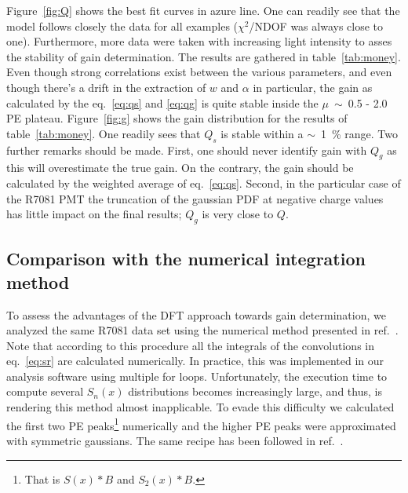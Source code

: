 \documentclass[a4paper,11pt]{article}
\begin{document}
Figure~\ref{fig:Q} shows the best fit curves in azure line. 
One can readily see that the model follows closely the data for all examples ($\chi^2$/NDOF was always close to one). 
Furthermore, more data were taken with increasing light intensity to asses the stability of gain determination. 
The results are gathered in table~\ref{tab:money}. 
Even though strong correlations exist between the various parameters, and even though there's a drift in the extraction of $w$ and $\alpha$  in particular,
the gain as calculated by the eq.~\eqref{eq:qs} and \eqref{eq:qg} is quite stable inside the $\mu$~$\sim$~0.5 - 2.0 PE plateau. 
Figure~\ref{fig:g} shows the gain distribution for the results of table~\ref{tab:money}. One readily sees that $Q_s$ is stable within a $\sim$~1~\% range. 
Two further remarks should be made. First, one should never identify gain with $Q_g$ as this will overestimate the true gain. 
On the contrary, the gain should be calculated by the weighted average of eq.~\eqref{eq:qs}. 
Second, in the particular case of the R7081 PMT the truncation of the gaussian PDF at negative charge values has little impact on the final results; 
$Q_g$ is very close to $Q$. 

\subsection{Comparison with the numerical integration method}
%

To assess the advantages of the DFT approach towards gain determination, we analyzed the same R7081 data set using the numerical method presented in ref.~\cite{dossi}.   
Note that according to this procedure all the integrals of the convolutions in eq.~\eqref{eq:sr} are calculated numerically. 
In practice, this was implemented in our analysis software using multiple for loops. 
Unfortunately, the execution time to compute several $S_n(x)$ distributions becomes increasingly large, and thus, is rendering this method almost inapplicable. 
To evade this difficulty we calculated the first two PE peaks\footnote{That is $S(x)*B$ and $S_2(x)*B$.} numerically and the higher PE peaks were approximated with symmetric gaussians. 
The same recipe has been followed in ref.~\cite{darkside}. 
\end{document}
